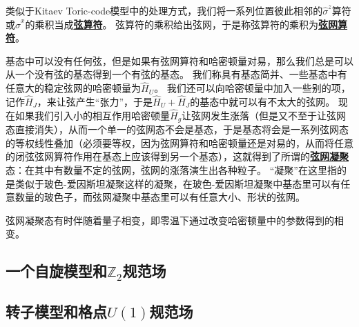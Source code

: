 \documentclass[hyperref, UTF8, a4paper]{ctexart}
\newcommand*{\concept}[1]{\underline{\textbf{#1}}}
\begin{document}
类似于Kitaev Toric-code模型中的处理方式，我们将一系列位置彼此相邻的$\hat{\sigma}^z$算符或$\hat{\sigma}^x$的乘积当成\concept{弦算符}。
弦算符的乘积给出弦网，于是称弦算符的乘积为\concept{弦网算符}。

基态中可以没有任何弦，但是如果有弦网算符和哈密顿量对易，那么我们总是可以从一个没有弦的基态得到一个有弦的基态。
我们称具有基态简并、一些基态中有任意大的稳定弦网的哈密顿量为$\hat{H}_U$。
我们还可以向哈密顿量中加入一些别的项，记作$\hat{H}_J$，来让弦产生“张力”，于是$\hat{H}_U+\hat{H}_J$的基态中就可以有不太大的弦网。
现在如果我们引入小的相互作用哈密顿量$\hat{H}_g$让弦网发生涨落（但是又不至于让弦网态直接消失），从而一个单一的弦网态不会是基态，于是基态将会是一系列弦网态的等权线性叠加（必须要等权，因为弦网算符和哈密顿量还是对易的，从而将任意的闭弦弦网算符作用在基态上应该得到另一个基态），这就得到了所谓的\concept{弦网凝聚}态：在其中有数量不定的弦网，弦网的涨落演生出各种粒子。
“凝聚”在这里指的是类似于玻色-爱因斯坦凝聚这样的凝聚，在玻色-爱因斯坦凝聚中基态里可以有任意数量的玻色子，而弦网凝聚中基态里可以有任意大小、形状的弦网。

弦网凝聚态有时伴随着量子相变，即零温下通过改变哈密顿量中的参数得到的相变。

\subsection{一个自旋模型和$\mathbb{Z}_2$规范场}



\subsection{转子模型和格点$U(1)$规范场}

\subsection{}
\end{document}
